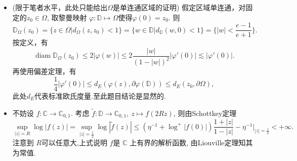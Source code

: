 \begin{itemize}
    \item[8.3.5] (限于笔者水平，此处只能给出$\Omega$是单连通区域的证明) 假定区域单连通，对固定的$z_0\in \Omega$, 取黎曼映射
    $\varphi: \mathbb{D} \mapsto \Omega$使得$\varphi(0)=z_0$. 则
    $$\mathbb{D}_{\Omega}(z_0) = \{z\in \Omega | d_\Omega(z,z_0) <1\} = \{w\in \mathbb{D} | d_\mathbb{D}(w,0) <1\}= \{|w|<\frac{e-1}{e+1}\}.$$
    按定义，有
    $$\operatorname{diam}\mathbb{D}_{\Omega}(z_0)\le2|\varphi(w)|\le 2\frac{|w|}{(1-|w|)^2}|\varphi'(0)|\lesssim|\varphi'(0)| .$$
    再使用偏差定理，有
    $$\frac{1}{4}|\varphi'(0)|\le d_{E}(\varphi(z),\partial \varphi(\mathbb{D}))\le d_{E}(z_0,\partial \Omega),$$
    此处$d_E$代表标准欧氏度量.至此题目结论是显然的.

    \item[8.3.6]  不妨设 $f:\mathbb{C}\to \mathbb{C}_{0,1}$. 
    考虑  $\tilde{f}:\mathbb{D}\to \mathbb{C}_{0,1}, \ z \mapsto f(2Rz)$, 
    则由Schottkey定理
    $$\sup_{|z| = R} \log|f(z)| = \sup_{|z| = \frac{1}{2}} \log|\tilde{f}(z)|
    \le (\eta^{-1}+\log^+ |f(0)|)\frac{1+|z|}{1-|z|}
    -\eta^{-1}\Big|_{|z|=\frac{1}{2}}<+\infty.$$
    注意到 $R$可以任意大,上式说明 $f$是 $\mathbb{C}$ 上有界的解析函数, 
    由Liouville定理知其为常值.
\end{itemize}
